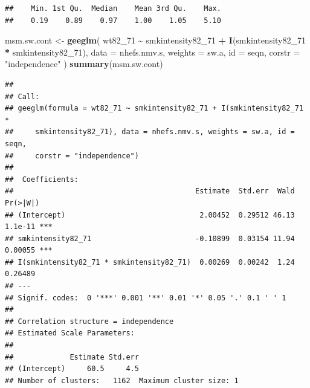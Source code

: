 \documentclass[
  10pt,
]{book}
\newenvironment{Shaded}{\begin{snugshade}}{\end{snugshade}}
\newcommand{\CommentTok}[1]{\textcolor[rgb]{0.56,0.35,0.01}{\textit{#1}}}
\newcommand{\DataTypeTok}[1]{\textcolor[rgb]{0.13,0.29,0.53}{#1}}
\newcommand{\DecValTok}[1]{\textcolor[rgb]{0.00,0.00,0.81}{#1}}
\newcommand{\KeywordTok}[1]{\textcolor[rgb]{0.13,0.29,0.53}{\textbf{#1}}}
\newcommand{\NormalTok}[1]{#1}
\newcommand{\OperatorTok}[1]{\textcolor[rgb]{0.81,0.36,0.00}{\textbf{#1}}}
\newcommand{\StringTok}[1]{\textcolor[rgb]{0.31,0.60,0.02}{#1}}
\begin{document}
\begin{Shaded}
\end{Shaded}

\begin{verbatim}
##    Min. 1st Qu.  Median    Mean 3rd Qu.    Max. 
##    0.19    0.89    0.97    1.00    1.05    5.10
\end{verbatim}

\begin{Shaded}
\begin{Highlighting}[]
\NormalTok{msm.sw.cont \textless{}{-}}
\StringTok{  }\KeywordTok{geeglm}\NormalTok{(}
\NormalTok{    wt82\_}\DecValTok{71} \OperatorTok{\textasciitilde{}}\StringTok{ }\NormalTok{smkintensity82\_}\DecValTok{71} \OperatorTok{+}\StringTok{ }\KeywordTok{I}\NormalTok{(smkintensity82\_}\DecValTok{71} \OperatorTok{*}\StringTok{ }\NormalTok{smkintensity82\_}\DecValTok{71}\NormalTok{),}
    \DataTypeTok{data =}\NormalTok{ nhefs.nmv.s,}
    \DataTypeTok{weights =}\NormalTok{ sw.a,}
    \DataTypeTok{id =}\NormalTok{ seqn,}
    \DataTypeTok{corstr =} \StringTok{"independence"}
\NormalTok{  )}
\KeywordTok{summary}\NormalTok{(msm.sw.cont)}
\end{Highlighting}
\end{Shaded}

\begin{verbatim}
## 
## Call:
## geeglm(formula = wt82_71 ~ smkintensity82_71 + I(smkintensity82_71 * 
##     smkintensity82_71), data = nhefs.nmv.s, weights = sw.a, id = seqn, 
##     corstr = "independence")
## 
##  Coefficients:
##                                          Estimate  Std.err  Wald Pr(>|W|)    
## (Intercept)                               2.00452  0.29512 46.13  1.1e-11 ***
## smkintensity82_71                        -0.10899  0.03154 11.94  0.00055 ***
## I(smkintensity82_71 * smkintensity82_71)  0.00269  0.00242  1.24  0.26489    
## ---
## Signif. codes:  0 '***' 0.001 '**' 0.01 '*' 0.05 '.' 0.1 ' ' 1
## 
## Correlation structure = independence 
## Estimated Scale Parameters:
## 
##             Estimate Std.err
## (Intercept)     60.5     4.5
## Number of clusters:   1162  Maximum cluster size: 1
\end{verbatim}
\end{document}
